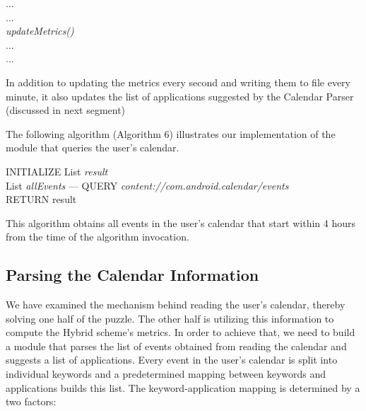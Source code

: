 \documentclass[12pt]{uthesis-v12}  %
\begin{document}
			\begin{algorithm}[H]
				\SetAlgoLined
				
				{	
					...\\
					...\\
					{\em updateMetrics()}\\
					...\\
					...\\	
				}
				
				\caption[Update Suggested Applications List]{In addition to updating the metrics every second and writing them to file every minute, it also updates the list of applications suggested by the Calendar Parser (discussed in next segment)}
			\end{algorithm}
			
			The following algorithm (Algorithm 6) illustrates our implementation of the module that queries the user's calendar.
			
			\begin{algorithm}[H]
				\SetAlgoLined
				INITIALIZE List {\em result}\\
				List {\em allEvents} ---  QUERY {\em content://com.android.calendar/events}\\
				{	
				}
				RETURN result
				\caption[Algorithm to read user's calendar]{This algorithm obtains all events in the user's calendar that start within 4 hours from the time of the algorithm invocation.}
			\end{algorithm}
						
		\subsection{Parsing the Calendar Information}
			We have examined the mechanism behind reading the user's calendar, thereby solving one half of the puzzle. The other half is utilizing this information to compute the Hybrid scheme's metrics. In order to achieve that, we need to build a module that parses the list of events obtained from reading the calendar and suggests a list of applications. Every event in the user's calendar is split into individual keywords and a predetermined mapping between keywords and applications builds this list. The keyword-application mapping is determined by a two factors:
			
\end{document}
